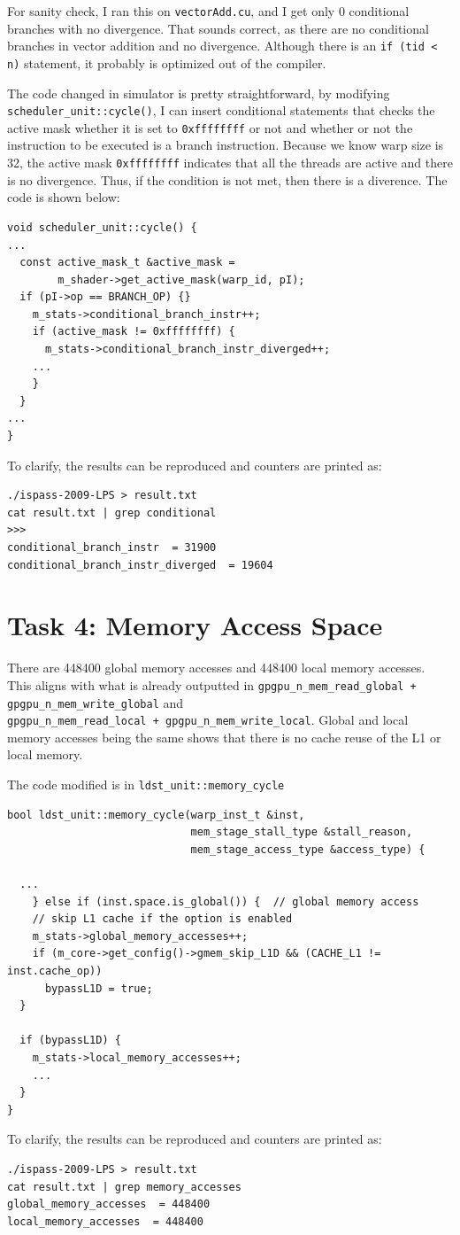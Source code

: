 \documentclass{article}
\begin{document}
For sanity check, I ran this on \verb|vectorAdd.cu|, and I get only 0 conditional branches with no divergence. That sounds correct, as there are no conditional branches in vector addition and no divergence. Although there is an \verb|if (tid < n)| statement, it probably is optimized out of the compiler.

The code changed in simulator is pretty straightforward, by modifying \verb|scheduler_unit::cycle()|, I can insert conditional statements that checks the active mask whether it is set to \verb|0xffffffff| or not and whether or not the instruction to be executed is a branch instruction. Because we know warp size is 32, the active mask \verb|0xffffffff| indicates that all the threads are active and there is no divergence. Thus, if the condition is not met, then there is a diverence. The code is shown below:

\begin{verbatim}
void scheduler_unit::cycle() {
...
  const active_mask_t &active_mask =
        m_shader->get_active_mask(warp_id, pI);      
  if (pI->op == BRANCH_OP) {}
    m_stats->conditional_branch_instr++;
    if (active_mask != 0xffffffff) {
      m_stats->conditional_branch_instr_diverged++;
    ...
    }
  }
...
}
\end{verbatim}

To clarify, the results can be reproduced and counters are printed as:
\begin{verbatim}
./ispass-2009-LPS > result.txt
cat result.txt | grep conditional
>>>
conditional_branch_instr  = 31900
conditional_branch_instr_diverged  = 19604
\end{verbatim}

\section{Task 4: Memory Access Space}

There are 448400 global memory accesses and 448400 local memory accesses. This aligns with what is already outputted in \verb|gpgpu_n_mem_read_global + gpgpu_n_mem_write_global| and
\\\verb|gpgpu_n_mem_read_local + gpgpu_n_mem_write_local|. Global and local memory accesses being the same shows that there is no cache reuse of the L1 or local memory.

The code modified is in \verb|ldst_unit::memory_cycle|
\begin{verbatim}
bool ldst_unit::memory_cycle(warp_inst_t &inst,
                             mem_stage_stall_type &stall_reason,
                             mem_stage_access_type &access_type) {

  ...
    } else if (inst.space.is_global()) {  // global memory access
    // skip L1 cache if the option is enabled
    m_stats->global_memory_accesses++;
    if (m_core->get_config()->gmem_skip_L1D && (CACHE_L1 != inst.cache_op))
      bypassL1D = true;
  }

  if (bypassL1D) {
    m_stats->local_memory_accesses++;
    ...
  } 
}
\end{verbatim}

To clarify, the results can be reproduced and counters are printed as:
\begin{verbatim}
./ispass-2009-LPS > result.txt
cat result.txt | grep memory_accesses
global_memory_accesses  = 448400
local_memory_accesses  = 448400
\end{verbatim}
\end{document}

